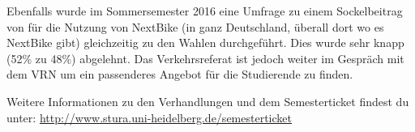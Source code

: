 Ebenfalls wurde im Sommersemester 2016 eine Umfrage zu einem Sockelbeitrag von
 für die Nutzung von NextBike (in ganz Deutschland, überall dort wo
es NextBike gibt) gleichzeitig zu den Wahlen durchgeführt. Dies wurde sehr
knapp (52\% zu 48\%) abgelehnt. Das Verkehrsreferat ist jedoch weiter im
Gespräch mit dem VRN um ein passenderes Angebot für die Studierende zu finden.

Weitere Informationen zu den Verhandlungen und dem Semesterticket findest du
unter: \url{http://www.stura.uni-heidelberg.de/semesterticket}



